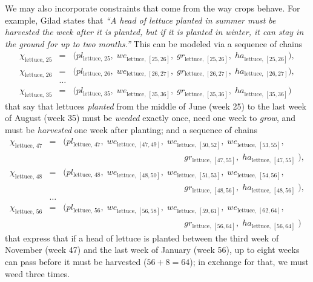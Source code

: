 \documentclass[11pt,reqno]{amsart}
\numberwithin{equation}{section}
\begin{document}
We may also incorporate constraints that come from the way crops behave. For example,
Gilad states that \emph{``A head of lettuce planted in summer must be harvested
  the week after it is planted, but if it is planted in winter, it can stay in the ground
  for up to two months.''} This can be modeled via a sequence of chains 
\begin{eqnarray*}
   \chi_{\text{lettuce},\, 25} 
   &=& 
   \big(
      pl_{\text{lettuce},\, 25}, \; 
      we_{\text{lettuce},\, [25,26]}, \;
      gr_{\text{lettuce},\, [25,26]}, \;
      ha_{\text{lettuce},\, [25,26]}
      \big), \\
   \chi_{\text{lettuce},\, 26} 
   &=& 
   \big(
      pl_{\text{lettuce},\, 26}, \; 
      we_{\text{lettuce},\, [26,27]}, \;
      gr_{\text{lettuce},\, [26,27]}, \;
      ha_{\text{lettuce},\, [26,27]}
      \big), \\
   &\dots& \\
   \chi_{\text{lettuce},\, 35} 
   &=& 
   \big(
      pl_{\text{lettuce},\, 35}, \; 
      we_{\text{lettuce},\, [35,36]}, \;
      gr_{\text{lettuce},\, [35,36]}, \;
      ha_{\text{lettuce},\, [35,36]}
      \big)
\end{eqnarray*}
that say that lettuces \emph{planted} from the middle of June (week 25) to the last week
of August (week 35) must be \emph{weeded} exactly once, need one week to \emph{grow}, and
must be \emph{harvested} one week after planting; and a sequence of chains
\begin{eqnarray*}
    \chi_{\text{lettuce},\, 47} 
   &=& 
   \big(
      pl_{\text{lettuce},\, 47}, \; 
      we_{\text{lettuce},\, [47,49]}, \;
      we_{\text{lettuce},\, [50,52]}, \;
      we_{\text{lettuce},\, [53,55]}, 
   \\ && \hspace{6cm}
      gr_{\text{lettuce},\, [47,55]}, \;
      ha_{\text{lettuce},\, [47,55]} \;
      \big), \\
    \chi_{\text{lettuce},\, 48} 
   &=& 
   \big(
      pl_{\text{lettuce},\, 48}, \; 
      we_{\text{lettuce},\, [48,50]}, \;
      we_{\text{lettuce},\, [51,53]}, \;
      we_{\text{lettuce},\, [54,56]}, 
   \\ && \hspace{6cm}
      gr_{\text{lettuce},\, [48,56]}, \;
      ha_{\text{lettuce},\, [48,56]} \;
      \big), \\
   &\dots& \\
   \chi_{\text{lettuce},\, 56} 
   &=& 
   \big(
      pl_{\text{lettuce},\, 56}, \; 
      we_{\text{lettuce},\, [56,58]}, \;
      we_{\text{lettuce},\, [59,61]}, \;
      we_{\text{lettuce},\, [62,64]}, 
   \\ && \hspace{6cm}
      gr_{\text{lettuce},\, [56,64]}, \;
      ha_{\text{lettuce},\, [56,64]} \;
      \big)
\end{eqnarray*}
that express that if a head of lettuce is planted between the third week of November (week 47)
and the last week of January (week 56), up to eight weeks can pass before it must be
harvested ($56+8=64$); in exchange for that, we must weed three times. 
\end{document}
